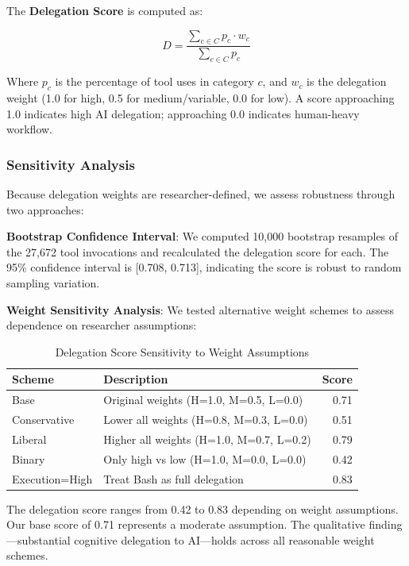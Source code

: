 The \textbf{Delegation Score} is computed as:

\begin{equation}
D = \frac{\sum_{c \in C} p_c \cdot w_c}{\sum_{c \in C} p_c}
\end{equation}

Where $p_c$ is the percentage of tool uses in category $c$, and $w_c$ is the delegation weight (1.0 for high, 0.5 for medium/variable, 0.0 for low). A score approaching 1.0 indicates high AI delegation; approaching 0.0 indicates human-heavy workflow.

\subsubsection{Sensitivity Analysis}
\label{sec:sensitivity}

Because delegation weights are researcher-defined, we assess robustness through two approaches:

\textbf{Bootstrap Confidence Interval}: We computed 10,000 bootstrap resamples of the 27,672 tool invocations and recalculated the delegation score for each. The 95\% confidence interval is [0.708, 0.713], indicating the score is robust to random sampling variation.

\textbf{Weight Sensitivity Analysis}: We tested alternative weight schemes to assess dependence on researcher assumptions:

\begin{table}[h]
\caption{Delegation Score Sensitivity to Weight Assumptions}
\label{tab:sensitivity}
\begin{tabular}{llr}
\toprule
\textbf{Scheme} & \textbf{Description} & \textbf{Score} \\
\midrule
Base & Original weights (H=1.0, M=0.5, L=0.0) & 0.71 \\
Conservative & Lower all weights (H=0.8, M=0.3, L=0.0) & 0.51 \\
Liberal & Higher all weights (H=1.0, M=0.7, L=0.2) & 0.79 \\
Binary & Only high vs low (H=1.0, M=0.0, L=0.0) & 0.42 \\
Execution=High & Treat Bash as full delegation & 0.83 \\
\bottomrule
\end{tabular}
\end{table}

The delegation score ranges from 0.42 to 0.83 depending on weight assumptions. Our base score of 0.71 represents a moderate assumption. The qualitative finding---substantial cognitive delegation to AI---holds across all reasonable weight schemes.

